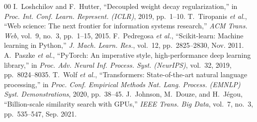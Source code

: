 \documentclass[journal]{IEEEtran}
\begin{document}
\begin{thebibliography}{00}
 I.~Loshchilov and F.~Hutter, ``Decoupled weight decay regularization,'' in \textit{Proc. Int. Conf. Learn. Represent. (ICLR)}, 2019, pp.~1--10.
 T.~Tiropanis \textit{et al.}, ``Web science: The next frontier for information systems research,'' \textit{ACM Trans. Web}, vol.~9, no.~3, pp.~1--15, 2015.
 F.~Pedregosa \textit{et al.}, ``Scikit-learn: Machine learning in Python,'' \textit{J. Mach. Learn. Res.}, vol.~12, pp.~2825--2830, Nov. 2011.
 A.~Paszke \textit{et al.}, ``PyTorch: An imperative style, high-performance deep learning library,'' in \textit{Proc. Adv. Neural Inf. Process. Syst. (NeurIPS)}, vol.~32, 2019, pp.~8024--8035.
 T.~Wolf \textit{et al.}, ``Transformers: State-of-the-art natural language processing,'' in \textit{Proc. Conf. Empirical Methods Nat. Lang. Process. (EMNLP) Syst. Demonstrations}, 2020, pp.~38--45.
 J.~Johnson, M.~Douze, and H.~Jégou, ``Billion-scale similarity search with GPUs,'' \textit{IEEE Trans. Big Data}, vol.~7, no.~3, pp.~535--547, Sep. 2021.
\end{thebibliography}
\end{document}
